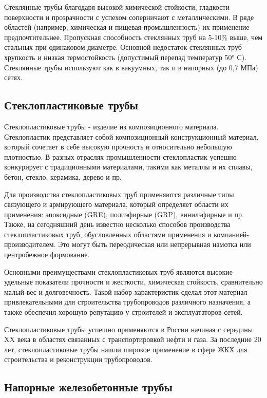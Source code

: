 \documentclass[a4paper,12pt,russian]{report}
\begin{document}
Стеклянные трубы благодаря высокой химической стойкости, гладкости поверхности и прозрачности с успехом соперничают с металлическими. В ряде областей (например, химическая и пищевая промышленность) их применение предпочтительнее. Пропускная способность стеклянных труб на 5-10\% выше, чем стальных при одинаковом диаметре. Основной недостаток стеклянных труб — хрупкость и низкая термостойкость (допустимый перепад температур 50° С). Стеклянные трубы используют как в вакуумных, так и в напорных (до 0,7 МПа) сетях.

\subsection{Стеклопластиковые трубы}

Стеклопластиковые трубы - изделие из композиционного материала. Стеклопластик представляет собой композиционный конструкционный материал, который сочетает в себе высокую прочность и относительно небольшую плотностью. В разных отраслях промышленности стеклопластик успешно конкурирует с традиционными материалами, такими как металлы и их сплавы, бетон, стекло, керамика, дерево и пр.

Для производства стеклопластиковых труб применяются различные типы связующего и армирующего материала, который определяет области их применения: эпоксидные (GRE), полиэфирные (GRP), винилэфирные и пр. Также, на сегодняшний день известно несколько способов производства стеклопластиковых труб, обусловленных областями применения и компанией-производителем. Это могут быть переодическая или непрерывная намотка или центробежное формование.

Основными преимуществами стеклопластиковых труб являются высокие удельные показатели прочности и жесткости,  химическая стойкость, сравнительно малый вес и долговечность. Такой набор характеристик сделал этот материал привлекательными для строительства трубопроводов различного назначения, а также обеспечил хорошую репутацию у строителей и эксплуататоров сетей.

Стеклопластиковые трубы успешно применяются в России начиная с середины XX века в областях связанных с транспортировкой нефти и газа. За последние 20 лет, стеклопластиковые трубы нашли широкое применение в сфере ЖКХ для строительства и реконструкции трубопроводов.

\subsection{Напорные железобетонные трубы}
\end{document}
